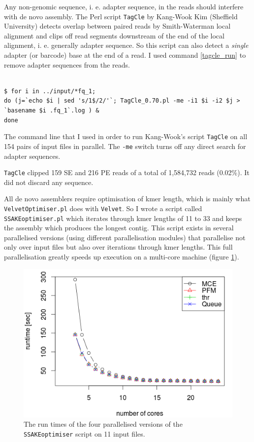\documentclass[a4paper,12pt,times,print,index, custombib]{PhDThesisPSnPDF}\usepackage[]{graphicx}\usepackage[]{color}
\begin{document}
Any non-genomic sequence, i. e. adapter sequence, in the reads should interfere with de novo assembly. The Perl script \texttt{TagCle} by Kang-Wook Kim (Sheffield University) detects overlap between paired reads by Smith-Waterman local alignment and clips off read segments downstream of the end of the local alignment, i. e. generally adapter sequence. So this script can also detect a \emph{single} adapter (or barcode) base at the end of a read. I used command \ref{tagcle_run} to remove adapter sequences from the reads.

\begin{cmd}
\captionsetup{type=cmd} %
\begin{Verbatim}[fontsize=\scriptsize, formatcom=\color{darkgray}]

$ for i in ../input/*fq_1; 
do (j=`echo $i | sed 's/1$/2/'`; TagCle_0.70.pl -me -i1 $i -i2 $j > `basename $i .fq_1`.log ) & 
done
\end{Verbatim}
\caption{The command line that I used in order to run Kang-Wook's script \texttt{TagCle} on all 154 pairs of input files in parallel. The \texttt{-me} switch turns off any direct search for adapter sequences.}
\label{tagcle_run}
\end{cmd}

\texttt{TagCle} clipped 159 SE and 216 PE reads of a total of 1,584,732 reads (0.02\%). It did not discard any sequence.

All de novo assemblers require optimisation of \gls{kmer} length, which is mainly what \texttt{VelvetOptimiser.pl} does with \texttt{Velvet}. So I wrote a script called \texttt{SSAKEoptimiser.pl} which iterates through \gls{kmer} lengths of 11 to 33 and keeps the assembly which produces the longest contig. This script exists in several parallelised versions (using different parallelisation modules) that parallelise not only over input files but also over iterations through \gls{kmer} lengths. This full parallelisation greatly speeds up execution on a multi-core machine (figure \ref{runtimes}).

\begin{figure}
\centering
\includegraphics[width=.9\textwidth]{Parallel_Module_Comp}
\caption{The run times of the four parallelised versions of the \texttt{SSAKEoptimiser} script on 11 input files.}
\label{runtimes}
\end{figure}
\end{document}

